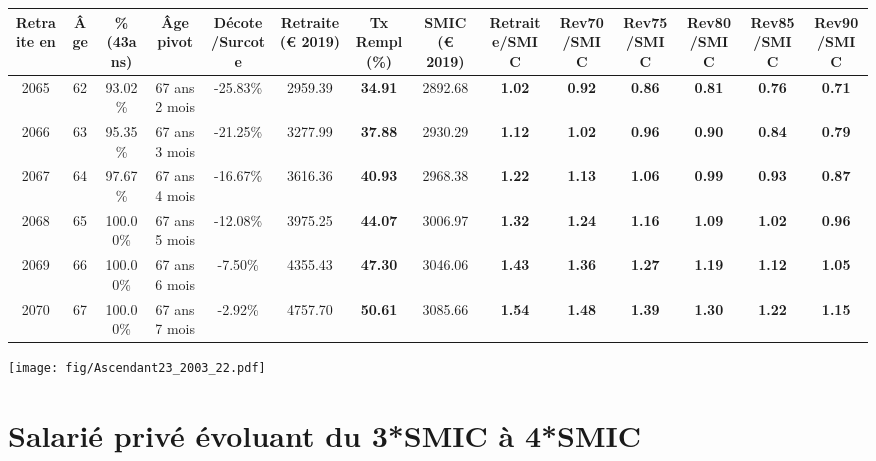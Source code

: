 \begin{adjustbox}{max width=\textwidth} 
\begin{tabular}[htb]{|c|c||c|c|c||c|c||c||c|c|c|c|c|c|} 
\hline 
 Retraite en &  Âge &  \%(43ans) &  Âge pivot &  Décote/Surcote &  Retraite (\euro{} 2019) &  Tx Rempl(\%) &  SMIC (\euro{} 2019) &  Retraite/SMIC &  Rev70/SMIC &  Rev75/SMIC &  Rev80/SMIC &  Rev85/SMIC &  Rev90/SMIC \\ 
\hline \hline 
 2065 &  62 &  93.02\% &  67 ans 2 mois &  -25.83\% &  2959.39 &  {\bf 34.91} &  2892.68 &  {\bf 1.02} &  {\bf {\color{red} 0.92}} &  {\bf {\color{red} 0.86}} &  {\bf {\color{red} 0.81}} &  {\bf {\color{red} 0.76}} &  {\bf {\color{red} 0.71}} \\ 
\hline 
 2066 &  63 &  95.35\% &  67 ans 3 mois &  -21.25\% &  3277.99 &  {\bf 37.88} &  2930.29 &  {\bf 1.12} &  {\bf 1.02} &  {\bf {\color{red} 0.96}} &  {\bf {\color{red} 0.90}} &  {\bf {\color{red} 0.84}} &  {\bf {\color{red} 0.79}} \\ 
\hline 
 2067 &  64 &  97.67\% &  67 ans 4 mois &  -16.67\% &  3616.36 &  {\bf 40.93} &  2968.38 &  {\bf 1.22} &  {\bf 1.13} &  {\bf 1.06} &  {\bf {\color{red} 0.99}} &  {\bf {\color{red} 0.93}} &  {\bf {\color{red} 0.87}} \\ 
\hline 
 2068 &  65 &  100.00\% &  67 ans 5 mois &  -12.08\% &  3975.25 &  {\bf 44.07} &  3006.97 &  {\bf 1.32} &  {\bf 1.24} &  {\bf 1.16} &  {\bf 1.09} &  {\bf 1.02} &  {\bf {\color{red} 0.96}} \\ 
\hline 
 2069 &  66 &  100.00\% &  67 ans 6 mois &  -7.50\% &  4355.43 &  {\bf 47.30} &  3046.06 &  {\bf 1.43} &  {\bf 1.36} &  {\bf 1.27} &  {\bf 1.19} &  {\bf 1.12} &  {\bf 1.05} \\ 
\hline 
 2070 &  67 &  100.00\% &  67 ans 7 mois &  -2.92\% &  4757.70 &  {\bf 50.61} &  3085.66 &  {\bf 1.54} &  {\bf 1.48} &  {\bf 1.39} &  {\bf 1.30} &  {\bf 1.22} &  {\bf 1.15} \\ 
\hline 
\hline 
\end{tabular} 
\end{adjustbox} 
 
 \vspace{0.1cm} 

 \begin{center}\texttt{[image: fig/Ascendant23\_2003\_22.pdf]}\end{center} \label{fig/Ascendant23_2003_22.pdf} 

\newpage 
 
\chapter{Salarié privé évoluant du 3*SMIC à 4*SMIC} 


